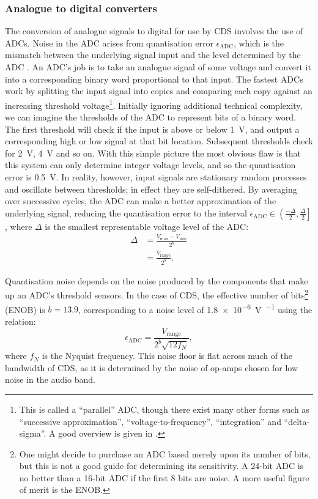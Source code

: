 \subsubsection{Analogue to digital converters}
The conversion of analogue signals to digital for use by \gls{CDS} involves the use of \glspl{ADC}. Noise in the \gls{ADC} arises from quantisation error $\epsilon_{\text{ADC}}$, which is the mismatch between the underlying signal input and the level determined by the \gls{ADC} \cite{Allen1997}. An \gls{ADC}'s job is to take an analogue signal of some voltage and convert it into a corresponding binary word proportional to that input. The fastest \glspl{ADC} work by splitting the input signal into copies and comparing each copy against an increasing threshold voltage\footnote{This is called a ``parallel'' \gls{ADC}, though there exist many other forms such as ``successive approximation'', ``voltage-to-frequency'', ``integration'' and ``delta-sigma''. A good overview is given in \cite{Horowitz2015}.}. Initially ignoring additional technical complexity, we can imagine the thresholds of the \gls{ADC} to represent bits of a binary word. The first threshold will check if the input is above or below \SI{1}{\volt}, and output a corresponding high or low signal at that bit location. Subsequent thresholds check for \SI{2}{\volt}, \SI{4}{\volt} and so on. With this simple picture the most obvious flaw is that this system can only determine integer voltage levels, and so the quantisation error is \SI{0.5}{\volt}. In reality, however, input signals are stationary random processes and oscillate between thresholds; in effect they are self-dithered. By averaging over successive cycles, the \gls{ADC} can make a better approximation of the underlying signal, reducing the quantisation error to the interval $\epsilon_{\text{ADC}} \in \left( \frac{-\Delta}{2}, \frac{\Delta}{2} \right]$, where $\Delta$ is the smallest representable voltage level of the \gls{ADC}:
\begin{equation}
  \begin{split}
    \Delta &= \frac{V_{\text{max}} - V_{\text{min}}}{2^{b}} \\
           &= \frac{V_{\text{range}}}{2^{b}}.
  \end{split}
\end{equation}

Quantisation noise depends on the noise produced by the components that make up an \gls{ADC}'s threshold sensors. In the case of \gls{CDS}, the effective number of bits\footnote{One might decide to purchase an \gls{ADC} based merely upon its number of bits, but this is not a good guide for determining its sensitivity. A 24-bit \gls{ADC} is no better than a 16-bit \gls{ADC} if the first 8 bits are noise. A more useful figure of merit is the \gls{ENOB}.} (\gls{ENOB}) is $b = 13.9$, corresponding to a noise level of \SI{1.8e-6}{\volt\per\sqrthz} using the relation:
\begin{equation}
  \epsilon_{\text{ADC}} = \frac{V_{\text{range}}}{2^b \sqrt{12 f_{N}}},
\end{equation}
where $f_{N}$ is the Nyquist frequency. This noise floor is flat across much of the bandwidth of \gls{CDS}, as it is determined by the noise of op-amps chosen for low noise in the audio band.

